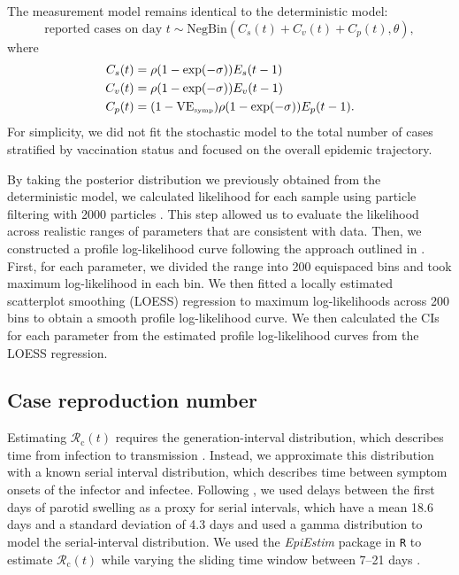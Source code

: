 \documentclass[12pt]{article}
\begin{document}
The measurement model remains identical to the deterministic model: 
\begin{equation}
\textrm{reported cases on day } t \sim \mathrm{NegBin}(C_s(t) + C_v(t) + C_p(t), \theta),
\end{equation}
where 
\begin{align}
C_s(t) &= \rho (1-\exp(- \sigma)) E_s(t-1)\\
C_v(t) &= \rho (1-\exp(- \sigma)) E_v(t-1)\\
C_p(t) &= (1- \mathrm{VE}_{\textrm{\tiny{symp}}}) \rho (1-\exp(- \sigma)) E_p(t-1).
\end{align}
For simplicity, we did not fit the stochastic model to the total number of cases stratified by vaccination status and focused on the overall epidemic trajectory.

By taking the posterior distribution we previously obtained from the deterministic model, we calculated likelihood for each sample using particle filtering with 2000 particles \citep{king2015statistical}.
This step allowed us to evaluate the likelihood across realistic ranges of parameters that are consistent with data.
Then, we constructed a profile log-likelihood curve following the approach outlined in \cite{park2021epidemiological}.
First, for each parameter, we divided the range into 200 equispaced bins and took maximum log-likelihood in each bin.
We then fitted a locally estimated scatterplot smoothing (LOESS) regression to maximum log-likelihoods across 200 bins to obtain a smooth profile log-likelihood curve.
We then calculated the CIs for each parameter from the estimated profile log-likelihood curves from the LOESS regression.

\subsection*{Case reproduction number}

Estimating $\mathcal{R}_{\mathrm c}(t)$ requires the generation-interval distribution, which describes time from infection to transmission \citep{gostic2020}. 
Instead, we approximate this distribution with a known serial interval distribution, which describes time between symptom onsets of the infector and infectee.
Following \cite{simpson1952infectiousness}, we used delays between the first days of parotid swelling as a proxy for serial intervals, which have a mean 18.6 days and a standard deviation of 4.3 days
and used a gamma distribution to model the serial-interval distribution.
We used the \textit{EpiEstim} package in \texttt{R} to estimate $\mathcal{R}_{\mathrm c}(t)$ while varying the sliding time window between 7--21 days \citep{cori2013new}.
\end{document}
